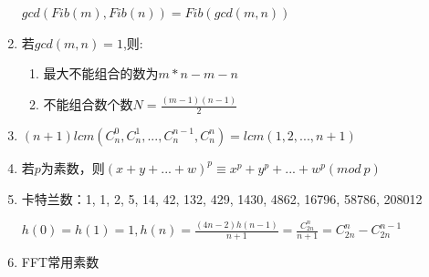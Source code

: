 \documentclass[twoside]{article}
\begin{document}
\begin{enumerate}
$gcd(Fib(m),Fib(n))=Fib(gcd(m,n))$

\item 若$gcd(m,n)=1$,则:

\begin{enumerate}
\item 最大不能组合的数为$m*n-m-n$
\item 不能组合数个数$N=\frac{(m-1)(n-1)}{2}$
\end{enumerate}

\item $(n+1)lcm(C_n^0,C_n^1,...,C_n^{n-1},C_n^{n})=lcm(1,2,...,n+1)$

\item 若$p$为素数，则$(x+y+...+w)^p\equiv x^p+y^p+...+w^p(mod\ p)$

\item 卡特兰数：1, 1, 2, 5, 14, 42, 132, 429, 1430, 4862, 16796, 58786, 208012

$h(0)=h(1)=1,h(n)=\frac{(4n-2)h(n-1)}{n+1}=\frac{C_{2n}^n}{n+1}=C_{2n}^n-C_{2n}^{n-1}$

\item FFT常用素数


\end{enumerate}
\end{document}
